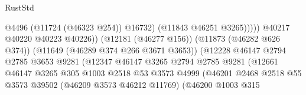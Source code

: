 \begin{lexlean}{RustStd}
\begin{coremodule}
                                                              @4496
                                                              (@11724 (@46323 @254))
                                                              @16732)
                                                            (@11843 @46251 @3265)))))
                                                    @40217
                                                    @40220
                                                    @40223
                                                    @40226))
                                                (@12181 (@46277 @156))
                                                (@11873 (@46282 @626 @374))
                                                (@11649 (@46289 @374 @266 @3671 @3653))
                                                (@12228
                                                  @46147
                                                  @2794
                                                  @2785
                                                  @3653
                                                  @9281
                                                  (@12347
                                                    @46147
                                                    @3265
                                                    @2794
                                                    @2785
                                                    @9281
                                                    (@12661
                                                      @46147
                                                      @3265
                                                      @305
                                                      @1003
                                                      @2518
                                                      @53
                                                      @3573
                                                      @4999
                                                      (@46201
                                                        @2468
                                                        @2518
                                                        @55
                                                        @3573
                                                        @39502
                                                        (@46209 @3573 @46212 @11769)
                                                        (@46200
                                                          @1003
                                                          @315

\end{coremodule}
\end{lexlean}
